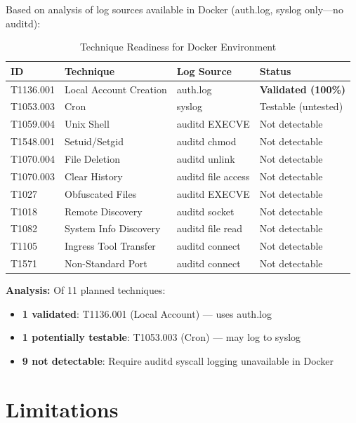\documentclass[11pt,a4paper]{article}
\begin{document}
Based on analysis of log sources available in Docker (auth.log, syslog only---no auditd):

\begin{table}[H]
    \centering
    \caption{Technique Readiness for Docker Environment}
    \label{tab:readiness}
    \begin{tabular}{llll}
        \toprule
        \textbf{ID} & \textbf{Technique} & \textbf{Log Source} & \textbf{Status} \\
        \midrule
        T1136.001 & Local Account Creation & auth.log & \textbf{Validated (100\%)} \\
        T1053.003 & Cron & syslog & Testable (untested) \\
        \midrule
        T1059.004 & Unix Shell & auditd EXECVE & Not detectable \\
        T1548.001 & Setuid/Setgid & auditd chmod & Not detectable \\
        T1070.004 & File Deletion & auditd unlink & Not detectable \\
        T1070.003 & Clear History & auditd file access & Not detectable \\
        T1027 & Obfuscated Files & auditd EXECVE & Not detectable \\
        T1018 & Remote Discovery & auditd socket & Not detectable \\
        T1082 & System Info Discovery & auditd file read & Not detectable \\
        T1105 & Ingress Tool Transfer & auditd connect & Not detectable \\
        T1571 & Non-Standard Port & auditd connect & Not detectable \\
        \bottomrule
    \end{tabular}
\end{table}

\textbf{Analysis:} Of 11 planned techniques:
\begin{itemize}
    \item \textbf{1 validated}: T1136.001 (Local Account) --- uses auth.log
    \item \textbf{1 potentially testable}: T1053.003 (Cron) --- may log to syslog
    \item \textbf{9 not detectable}: Require auditd syscall logging unavailable in Docker
\end{itemize}

\section{Limitations}
\end{document}
